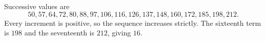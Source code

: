 Successive values are
\[
50,57,64,72,80,88,97,106,116,126,137,148,160,172,185,198,212.
\]
Every increment is positive, so the sequence increases strictly. The sixteenth term is $198$ and the seventeenth is $212$, giving $\boxed{16}$.
